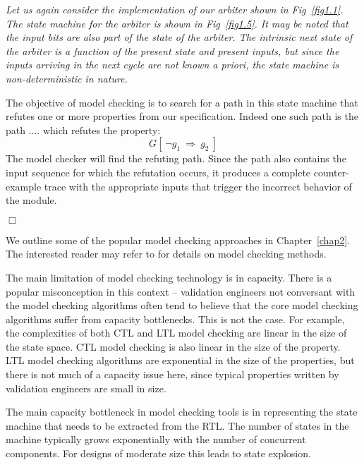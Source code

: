 \begin{example}
{\em 
Let us again consider the implementation of our arbiter shown in 
Fig~\ref{fig1.1}. The state machine for the arbiter is shown in
Fig~\ref{fig1.5}. It may be noted that the input bits are also part of the
state of the arbiter. The intrinsic next state of the arbiter is a function
of the present state and present inputs, but since the inputs arriving in the
next cycle are not known a priori, the state machine is non-deterministic
in nature.

The objective of model checking is to search for a path in this state machine
that refutes one or more properties from our specification. Indeed one such
path is the path .... which refutes the property:
\[ G[\ \neg g_1\ \Rightarrow\  g_2\ ] \]
The model checker will find the refuting path. Since the path also contains
the input sequence for which the refutation occurs, it produces a complete
counter-example trace with the appropriate inputs that trigger the incorrect 
behavior of the module.
} $\Box$
\end{example}

We outline some of the popular model checking approaches in 
Chapter~\ref{chap2}. The interested reader may refer to \cite{clarke:00}
for details on model checking methods.

The main limitation of model checking technology is in capacity. There is a
popular misconception in this context -- validation engineers not conversant
with the model checking algorithms often tend to believe that the core model
checking algorithms suffer from capacity bottlenecks. This is not the case.
For example, the complexities of both CTL and LTL model checking are linear
in the size of the state space. CTL model checking is also linear in the size
of the property. LTL model checking algorithms are exponential in the size
of the properties, but there is not much of a capacity issue here, since 
typical properties written by validation engineers are small in size.

The main capacity bottleneck in model checking tools is in representing the
state machine that needs to be extracted from the RTL. The number of states
in the machine typically grows exponentially with the number of concurrent
components. For designs of moderate size this leads to state explosion.

